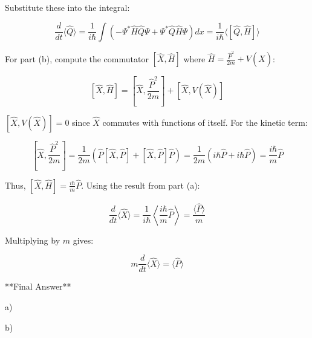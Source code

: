 \documentclass{article}
\begin{document}
Substitute these into the integral:

\[
\frac{d}{dt} \langle \hat{Q} \rangle = \frac{1}{i\hbar} \int \left( -\Psi^* \hat{H} \hat{Q} \Psi + \Psi^* \hat{Q} \hat{H} \Psi \right) dx = \frac{1}{i\hbar} \langle [\hat{Q}, \hat{H}] \rangle
\]

For part (b), compute the commutator $[\hat{X}, \hat{H}]$ where $\hat{H} = \frac{\hat{P}^2}{2m} + V(\hat{X})$:

\[
[\hat{X}, \hat{H}] = \left[ \hat{X}, \frac{\hat{P}^2}{2m} \right] + [\hat{X}, V(\hat{X})]
\]

$[\hat{X}, V(\hat{X})] = 0$ since $\hat{X}$ commutes with functions of itself. For the kinetic term:

\[
\left[ \hat{X}, \frac{\hat{P}^2}{2m} \right] = \frac{1}{2m} \left( \hat{P} [\hat{X}, \hat{P}] + [\hat{X}, \hat{P}] \hat{P} \right) = \frac{1}{2m} (i\hbar \hat{P} + i\hbar \hat{P}) = \frac{i\hbar}{m} \hat{P}
\]

Thus, $[\hat{X}, \hat{H}] = \frac{i\hbar}{m} \hat{P}$. Using the result from part (a):

\[
\frac{d}{dt} \langle \hat{X} \rangle = \frac{1}{i\hbar} \left\langle \frac{i\hbar}{m} \hat{P} \right\rangle = \frac{\langle \hat{P} \rangle}{m}
\]

Multiplying by $m$ gives:

\[
m \frac{d}{dt} \langle \hat{X} \rangle = \langle \hat{P} \rangle
\]

**Final Answer**

a) 

b) 
\end{document}

